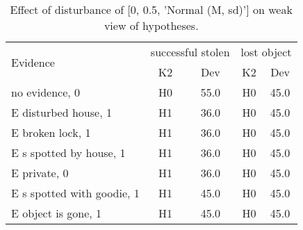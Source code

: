 \begin{table}\begin{tabular}{l|cc|cc}\toprule\multirow{2}{*}{Evidence} & \multicolumn{2}{c}{successful stolen}& \multicolumn{2}{c}{lost object}\\& {K2} & {Dev}& {K2} & {Dev}\\\midrule
no evidence, 0 & \cellcolor{Bittersweet}H0&\cellcolor{Bittersweet}55.0&\cellcolor{Bittersweet}H0&\cellcolor{Bittersweet}45.0\\E disturbed house, 1 & \cellcolor{Bittersweet}H1&\cellcolor{Bittersweet}36.0&\cellcolor{Bittersweet}H0&\cellcolor{Bittersweet}45.0\\E broken lock, 1 & \cellcolor{Bittersweet}H1&\cellcolor{Bittersweet}36.0&\cellcolor{Bittersweet}H0&\cellcolor{Bittersweet}45.0\\E s spotted by house, 1 & \cellcolor{Bittersweet}H1&\cellcolor{Bittersweet}36.0&\cellcolor{Bittersweet}H0&\cellcolor{Bittersweet}45.0\\E private, 0 & \cellcolor{Bittersweet}H1&\cellcolor{Bittersweet}36.0&\cellcolor{Bittersweet}H0&\cellcolor{Bittersweet}45.0\\E s spotted with goodie, 1 & \cellcolor{Bittersweet}H1&\cellcolor{Bittersweet}45.0&\cellcolor{Bittersweet}H0&\cellcolor{Bittersweet}45.0\\E object is gone, 1 & \cellcolor{Bittersweet}H1&\cellcolor{Bittersweet}45.0&\cellcolor{Bittersweet}H0&\cellcolor{Bittersweet}45.0\\\bottomrule\end{tabular}\caption{Effect of disturbance of [0, 0.5, 'Normal (M, sd)'] on weak view of hypotheses.}\end{table}